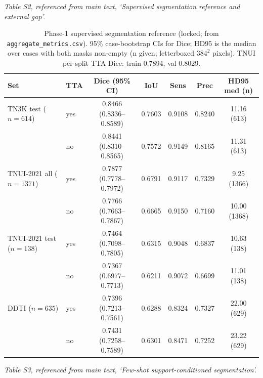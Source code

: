 \documentclass[11pt]{article}
\begin{document}
\noindent\emph{Table S2, referenced from main text, `Supervised segmentation reference and external gap'.}

\begin{table}[!ht]
\centering\footnotesize
\caption{Phase-1 supervised segmentation reference (locked; from
\texttt{aggregate\_metrics.csv}). 95\% case-bootstrap CIs for Dice; HD95 is the
median over cases with both masks non-empty (n given; letterboxed
$384^2$ pixels). TNUI per-split TTA Dice: train 0.7894, val 0.8029.}
\label{tab:phase1}
\begin{tabular}{llccccc}
\toprule
Set & TTA & Dice (95\% CI) & IoU & Sens & Prec & HD95 med (n) \\
\midrule
TN3K test ($n{=}614$) & yes & 0.8466 (0.8336--0.8589) & 0.7603 & 0.9108 & 0.8240 & 11.16 (613) \\
                      & no  & 0.8441 (0.8310--0.8565) & 0.7572 & 0.9149 & 0.8165 & 11.31 (613) \\
TNUI-2021 all ($n{=}1371$) & yes & 0.7877 (0.7778--0.7972) & 0.6791 & 0.9117 & 0.7329 & 9.25 (1366) \\
                      & no  & 0.7766 (0.7663--0.7867) & 0.6665 & 0.9150 & 0.7160 & 10.00 (1368) \\
TNUI-2021 test ($n{=}138$) & yes & 0.7464 (0.7098--0.7805) & 0.6315 & 0.9048 & 0.6837 & 10.63 (138) \\
                      & no  & 0.7367 (0.6977--0.7713) & 0.6211 & 0.9072 & 0.6699 & 11.01 (138) \\
DDTI ($n{=}635$)      & yes & 0.7396 (0.7213--0.7561) & 0.6288 & 0.8324 & 0.7327 & 22.00 (629) \\
                      & no  & 0.7431 (0.7258--0.7589) & 0.6301 & 0.8471 & 0.7252 & 23.22 (629) \\
\bottomrule
\end{tabular}
\end{table}

\noindent\emph{Table S3, referenced from main text, `Few-shot support-conditioned segmentation'.}
\end{document}
